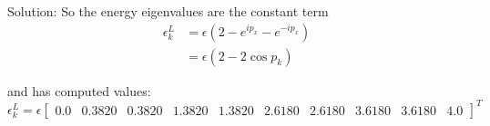 \begin{homeworkProblem}
\begin{enumerate}[(a)]
\begin{callout}{Solution:}
                    So the energy eigenvalues are the constant term 
                    \begin{align*}
                        \epsilon_k^{L} &= \epsilon \left( 2 - e^{ip_x} - e^{-ip_x} \right) \\
                                       &= \epsilon (2 - 2\cos p_k)
                    \end{align*}

                    and has computed values:
                    \footnotesize{
                        $$\epsilon_k^{L} = \epsilon \begin{bmatrix} 0.0 & 0.3820 & 0.3820 & 1.3820 & 1.3820 & 2.6180 & 2.6180 & 3.6180 & 3.6180 & 4.0 \end{bmatrix}^T$$
                    }


                \end{callout}
        \end{enumerate}
    \end{homeworkProblem}


